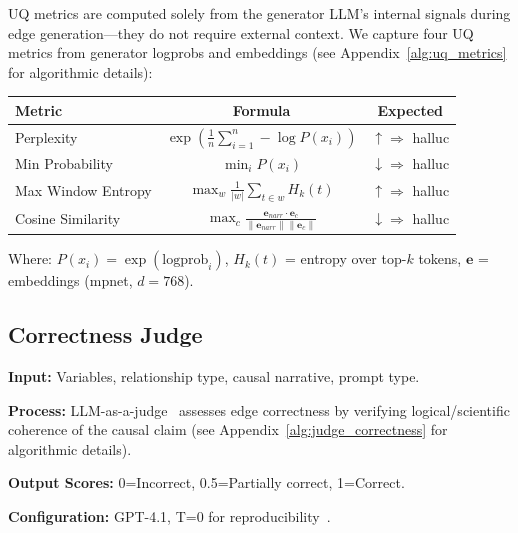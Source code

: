 UQ metrics are computed solely from the generator LLM's internal signals during edge generation---they do not require external context. We capture four UQ metrics from generator logprobs and embeddings (see Appendix~\ref{alg:uq_metrics} for algorithmic details):

\begin{table}[H]
\centering
\footnotesize
\begin{tabular}{@{}lcc@{}}
\toprule
\textbf{Metric} & \textbf{Formula} & \textbf{Expected} \\
\midrule
Perplexity & $\displaystyle\exp\left(\frac{1}{n}\sum_{i=1}^{n} -\log P(x_i)\right)$ & $\uparrow \Rightarrow$ halluc \\[1.5ex]
Min Probability & $\displaystyle\min_i P(x_i)$ & $\downarrow \Rightarrow$ halluc \\[1.5ex]
Max Window Entropy & $\displaystyle\max_w \frac{1}{|w|} \sum_{t \in w} H_k(t)$ & $\uparrow \Rightarrow$ halluc \\[1.5ex]
Cosine Similarity & $\displaystyle\max_c \frac{\mathbf{e}_{narr} \cdot \mathbf{e}_c}{\|\mathbf{e}_{narr}\| \|\mathbf{e}_c\|}$ & $\downarrow \Rightarrow$ halluc \\
\bottomrule
\end{tabular}
\end{table}

Where: $P(x_i) = \exp(\text{logprob}_i)$, $H_k(t)$ = entropy over top-$k$ tokens, $\mathbf{e}$ = embeddings (mpnet, $d=768$).

\subsection{Correctness Judge}
\label{sec:correctness_judge}

\textbf{Input:} Variables, relationship type, causal narrative, prompt type.

\textbf{Process:} LLM-as-a-judge~\cite{zheng2024llmasajudge} assesses edge correctness by verifying logical/scientific coherence of the causal claim (see Appendix~\ref{alg:judge_correctness} for algorithmic details).

\textbf{Output Scores:} 0=Incorrect, 0.5=Partially correct, 1=Correct.

\textbf{Configuration:} GPT-4.1, T=0 for reproducibility~\citep{liu2023gevalnlgevaluationusing, zheng2024judging}.

